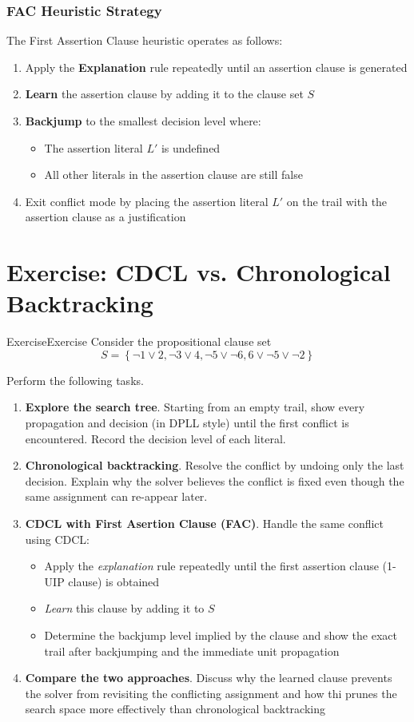 \documentclass[a4paper]{article}
\theoremstyle{definition}
\begin{document}
\subsubsection{FAC Heuristic Strategy}
The First Assertion Clause heuristic operates as follows:
\begin{enumerate}
  \item Apply the \textbf{Explanation} rule repeatedly until an assertion clause is generated 
  \item \textbf{Learn} the assertion clause by adding it to the clause set \( S \)     
  \item \textbf{Backjump} to the smallest decision level where:
  \begin{itemize}
    \item The assertion literal \( L' \) is undefined 
    \item All other literals in the assertion clause are still false
  \end{itemize}
  \item Exit conflict mode by placing the assertion literal \( L' \) on the trail with the assertion clause as a justification 
\end{enumerate}
\section{Exercise: CDCL vs. Chronological Backtracking}
\begin{example}{Exercise}{Exercise}
Consider the propositional clause set
\[
  S = \left\{ \lnot 1 \vee 2, \lnot 3 \vee 4, \lnot 5 \vee \lnot 6, 6 \vee \lnot 5 \vee \lnot 2 \right\}
\]
\end{example}
Perform the following tasks.
\begin{enumerate}
  \item \textbf{Explore the search tree}. Starting from an empty trail, show every propagation and decision (in DPLL style)
    until the first conflict is encountered. Record the decision level of each literal.
  \item \textbf{Chronological backtracking}. Resolve the conflict by undoing only the last decision. Explain why the solver 
    believes the conflict is fixed even though the same assignment can re-appear later.
  \item \textbf{CDCL with First Asertion Clause (FAC)}. Handle the same conflict using CDCL:
  \begin{itemize}
    \item[(a)] Apply the \textit{explanation} rule repeatedly until the first assertion clause (1-UIP clause) is obtained 
    \item[(b)] \textit{Learn} this clause by adding it to \( S \)   
    \item[(c)] Determine the backjump level implied by the clause and show the exact trail after backjumping and the immediate unit propagation 
  \end{itemize}
  \item \textbf{Compare the two approaches}. Discuss why the learned clause prevents the solver from revisiting the conflicting assignment 
    and how thi prunes the search space more effectively than chronological backtracking
\end{enumerate}
\end{document}
